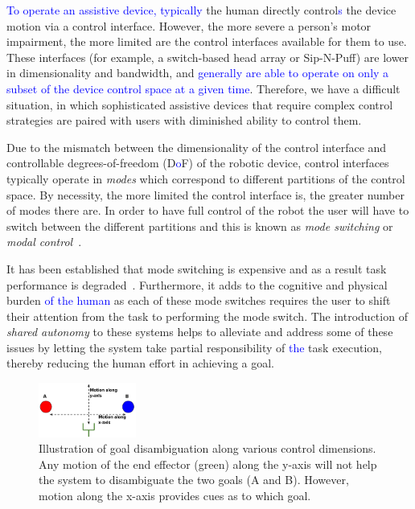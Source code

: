 \documentclass[conference]{IEEEtran}
\begin{document}
\textcolor{blue}{To operate an assistive device, typically} the human directly control\textcolor{blue}{s} the device motion via a control interface. However, the more severe a person's motor impairment, the more limited are the control interfaces available for them to use. These interfaces (for example, a switch-based head array or Sip-N-Puff) are lower in dimensionality and bandwidth, and \textcolor{blue}{generally are able to operate on only a subset of the device control space at a given time}. Therefore, we have a difficult situation, in which sophisticated assistive devices that require complex control strategies are paired with users with diminished ability to control them.

Due to the mismatch between the dimensionality of the control interface and controllable degrees-of-freedom (D\textcolor{blue}{o}F) of the robotic device, control interfaces typically operate in \textit{modes} which correspond to different partitions of the control space. By necessity, the more limited the control interface is, the greater number of modes there are. In order to have full control of the robot the user will have to switch between the different partitions and this is known as \textit{mode switching} or \textit{modal control}~\cite{nuttin2002selection,tsui2008development}. 

It has been established that mode switching is expensive and as a result task performance is degraded~\cite{herlant2016assistive}. Furthermore, it adds to the cognitive and physical burden \textcolor{blue}{of the human} as each of these mode switches requires the user to shift their attention from the task to performing the mode switch. The introduction of \textit{shared autonomy} to these systems helps to alleviate and address some of these issues by letting the system take partial responsibility of \textcolor{blue}{the} task execution, thereby reducing the human effort in achieving a goal. 
\begin{figure}[b]
	\begin{center}
		\includegraphics[width=0.285\textwidth]{./figures/DE_PDF.pdf}
	\end{center}
	\caption{Illustration of goal disambiguation along various control dimensions. Any motion of the end effector (green) along the y-axis will not help the system to disambiguate the two goals (A and B). However, motion along the x-axis provides cues as to which goal.}
	\label{DE}
\end{figure}
\end{document}
